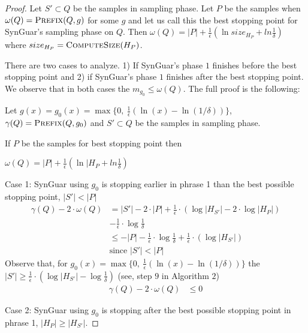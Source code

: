 \documentclass[11pt]{extarticle}
\newcommand{\tool}{{\sc SynGuar}\xspace}
\newcommand{\parf}{g}
\begin{document}
\begin{proof}
Let $S'\subset Q$ be the samples in sampling phase. Let $P$ be the samples when $\omega(Q)=\Call{Prefix}{Q,g}$ for some $g$ and let us call this the best stopping point for \tool's sampling phase on $Q$. Then $\omega(Q)=|P|+\frac{1}{\epsilon}(\ln{size_{H_{P}}} + ln{\frac{1}{\delta}})$ where $size_{H_{P}}= \Call{ComputeSize}{H_{P}}$.

There are two cases to analyze. 1) If \tool's phase $1$ finishes before the best stopping point and 2) if \tool's phase $1$ finishes after the best stopping point. We observe that in both cases the $m_{g_0}\le\omega(Q)$. 
The full proof is the following:

Let $\parf(x) = \parf_0(x)=\max\{0, ~\frac{1}{\epsilon}(\ln(x)-\ln(1/\delta))\}$, $\gamma(Q) = \Call{Prefix}{Q,\parf_0}$ and $S'\subset Q$ be the samples in sampling phase.

If $P$ be the samples for best stopping point then

$\omega(Q)=|P|+\frac{1}{\epsilon}(\ln{|H_P} + ln{\frac{1}{\delta}})$

\noindent Case 1: \tool using $\parf_0$ is stopping earlier in phrase 1 than the best possible stopping point, $|S'| < |P|$
\begin{align*}
    \gamma(Q) - 2\cdot\omega(Q) &= |S'|- 2\cdot|P| +  \frac{1}{\epsilon}\cdot(\log{|H_{S'}|} - 2\cdot \log{|H_{P}|})\\ 
    &- \frac{1}{\epsilon}\cdot\log{\frac{1}{\delta}}\\
    & \leq -|P| - \frac{1}{\epsilon}\cdot\log{\frac{1}{\delta}} + \frac{1}{\epsilon}\cdot(\log{|H_{S'}|})\\
    &\text{since }|S'| < |P|
\end{align*}
Observe that, for $\parf_0(x)=\max\{0, ~\frac{1}{\epsilon}(\ln(x)-\ln(1/\delta))\} $ the 
$|S'| \geq \frac{1}{\epsilon}\cdot(\log{|H_{S'}|}-\log{\frac{1}{\delta}})$ (see, step $9$ in Algorithm $2$)
\begin{align*}
    \gamma(Q) - 2\cdot\omega(Q) &\leq 0
\end{align*}

\noindent Case 2: \tool using $\parf_0$ is stopping after the best possible stopping point in phrase 1, $|H_{P}|\ge|H_{S'}|$.


\end{proof}
\end{document}
